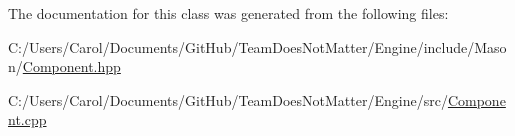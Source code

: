 The documentation for this class was generated from the following files\+:\begin{DoxyCompactItemize}
\item 
C\+:/\+Users/\+Carol/\+Documents/\+Git\+Hub/\+Team\+Does\+Not\+Matter/\+Engine/include/\+Mason/\hyperlink{_component_8hpp}{Component.\+hpp}\item 
C\+:/\+Users/\+Carol/\+Documents/\+Git\+Hub/\+Team\+Does\+Not\+Matter/\+Engine/src/\hyperlink{_component_8cpp}{Component.\+cpp}\end{DoxyCompactItemize}
